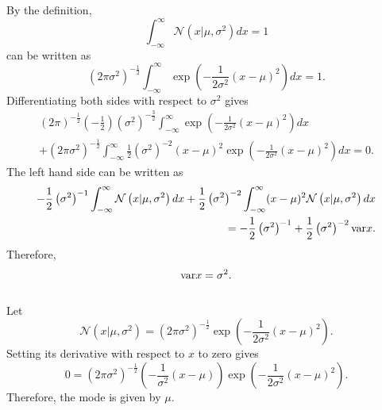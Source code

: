 By the definition,  
%
\begin{equation}
\int_{- \infty}^{\infty} \mathcal{N} \left( x | \mu, \sigma ^ 2 \right) dx = 1
\end{equation}
%
can be written as
%
\begin{equation}
\left( 2 \pi \sigma ^ 2 \right) ^ {-\frac{1}{2}} \int_{-\infty}^{\infty} \exp \left( - \frac{1}{2 \sigma ^ 2} (x - \mu) ^ 2 \right) dx = 1.
\end{equation}
%
Differentiating both sides with respect to $\sigma ^ 2$ gives 
%
\begin{equation}
\begin{aligned}
\left( 2 \pi \right) ^ {-\frac{1}{2}} \left( - \frac{1}{2} \right) \left( \sigma ^ 2 \right) ^ {- \frac{3}{2}} \int_{-\infty}^{\infty} \exp \left( -\frac{1}{2 \sigma ^ 2} (x - \mu) ^ 2 \right) dx \\
+ \left( 2 \pi \sigma ^ 2 \right) ^ {-\frac{1}{2}} \int_{-\infty}^{\infty} \frac{1}{2} \left( \sigma ^ 2 \right) ^ {- 2} (x - \mu) ^ 2 \exp \left( - \frac{1}{2 \sigma ^ 2} (x - \mu) ^ 2 \right) dx = 0.
\end{aligned}
\end{equation}
%
The left hand side can be written as
%
\begin{equation}
\begin{aligned}
- \frac{1}{2} \left( \sigma ^ 2 \right) ^ {- 1} \int_{- \infty}^{\infty} \mathcal{N} \left( x | \mu, \sigma ^ 2 \right) dx + \frac{1}{2} \left( \sigma ^ 2 \right) ^ {- 2} \int_{- \infty} ^ {\infty} (x - \mu) ^ 2 \mathcal{N} \left( x | \mu, \sigma ^ 2 \right) dx \\
= - \frac{1}{2} \left( \sigma ^ 2 \right) ^ {- 1} + \frac{1}{2} \left( \sigma ^ 2 \right) ^ {- 2} {\rm var} x.
\end{aligned}
\end{equation}
%
Therefore,
%
\begin{equation}
{\rm var} x = \sigma ^ 2.
\end{equation}
%


\subsection{}
Let
%
\begin{equation}
\mathcal{N} \left( x | \mu, \sigma ^ 2 \right) = \left( 2 \pi \sigma ^ 2 \right) ^ {- \frac{1}{2}} \exp \left( - \frac{1}{2 \sigma ^ 2} (x - \mu) ^ 2 \right).
\end{equation}
%
Setting its derivative with respect to $x$ to zero gives
%
\begin{equation}
0 = \left( 2 \pi \sigma ^ 2 \right) ^ {- \frac{1}{2}} \left( - \frac{1}{\sigma ^ 2} (x - \mu) \right) \exp \left( - \frac{1}{2 \sigma ^ 2} (x - \mu) ^ 2 \right).
\end{equation}
%
Therefore, the mode is given by $\mu$.

